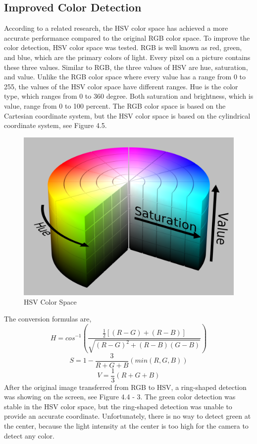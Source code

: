 \subsection{Improved Color Detection}

According to a related research, the HSV color space has achieved a more accurate performance compared to the original RGB color space. \cite{kaur2013content} To improve the color detection, HSV color space was tested. RGB is well known as red, green, and blue, which are the primary colors of light. Every pixel on a picture contains these three values. Similar to RGB, the three values of HSV are hue, saturation, and value. Unlike the RGB color space where every value has a range from 0 to 255, the values of the HSV color space have different ranges. Hue is the color type, which ranges from 0 to 360 degree. Both saturation and brightness, which is value, range from 0 to 100 percent. The RGB color space is based on the Cartesian coordinate system, but the HSV color space is based on the cylindrical coordinate system, see Figure 4.5.
\begin{figure}[ht!]
\begin{center}
\includegraphics[scale = 0.2]{pics/HSV.png}
\caption{HSV Color Space}
\end{center}
\end{figure}

The conversion formulas \cite{kaur2013content} are,
\begin{equation}
H = cos^{-1}(\frac{\frac{1}{2}[(R-G)+(R-B)]}{\sqrt{(R-G)^{2}+(R-B)(G-B)}})
\end{equation}
\begin{equation}
S = 1-\frac{3}{R+G+B}(min(R,G,B))
\end{equation}
\begin{equation}
V = \frac{1}{3}(R+G+B)
\end{equation}
After the original image transferred from RGB to HSV, a ring-shaped detection was showing on the screen, see Figure 4.4 - 3. The green color detection was stable in the HSV color space, but the ring-shaped detection was unable to provide an accurate coordinate. Unfortunately, there is no way to detect green at the center, because the light intensity at the center is too high for the camera to detect any color.
